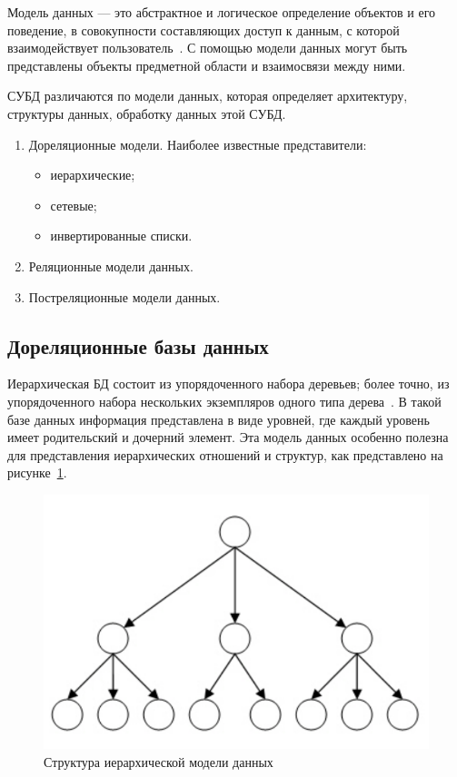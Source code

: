 Модель данных --- это абстрактное и логическое определение объектов и его поведение, в совокупности составляющих доступ к данным, с которой взаимодействует пользователь~\cite{intro-db-williams}.
С помощью модели данных могут быть представлены объекты предметной области и взаимосвязи между ними.

СУБД различаются по модели данных, которая определяет архитектуру, структуры данных, обработку данных этой СУБД.
\begin{enumerate}
	\item Дореляционные модели. Наиболее известные представители:
	\begin{itemize}
		\item иерархические;
		\item сетевые;
		\item инвертированные списки. 
	\end{itemize}
	\item Реляционные модели данных.
	\item Постреляционные модели данных.
\end{enumerate}

\subsection*{Дореляционные базы данных}

Иерархическая БД состоит из упорядоченного набора деревьев; более точно, из упорядоченного набора нескольких экземпляров одного типа дерева~\cite{kuznecov-db}. 
В такой базе данных информация представлена в виде уровней, где каждый уровень имеет родительский и дочерний элемент. Эта модель данных особенно полезна для представления иерархических отношений и структур, как представлено на рисунке~\ref{fig:i-db}.

\clearpage

\begin{figure}[h]
	\centering
	\includegraphics[height=0.2\textheight]{img/i-db.png}
	\caption{Структура иерархической модели данных}
	\label{fig:i-db}
\end{figure}

